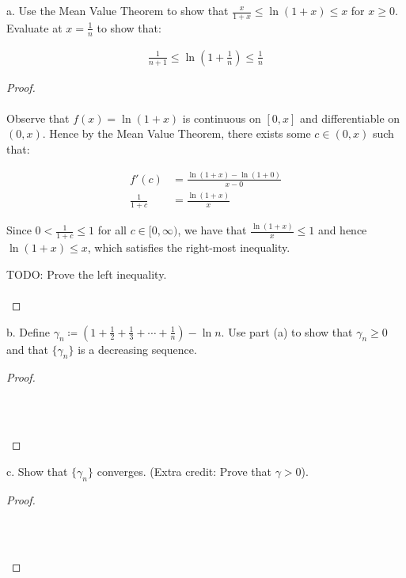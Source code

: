 a.  Use the Mean Value Theorem to show that
    $\frac{x}{1 + x} \le \ln{\left(1 + x\right)} \le x$ for $x \ge 0$. Evaluate at
    $x = \frac{1}{n}$ to show that:

    \begin{align*}
        \frac{1}{n+1} \le \ln{\left(1 + \frac{1}{n}\right)} \le \frac{1}{n}
    \end{align*}

    \begin{proof}\renewcommand{\qedsymbol}{}\ \\\\
        Observe that $f(x) = \ln{(1+x)}$ is continuous on $[0, x]$ and
        differentiable on $(0, x)$. Hence by the Mean Value Theorem, there
        exists some $c \in (0, x)$ such that:
    
        \begin{align*}
            f'(c) &= \frac{\ln(1+x) - \ln(1+0)}{x-0} \\
            \frac{1}{1+c} &= \frac{\ln(1+x)}{x}
        \end{align*}

        Since $0 < \frac{1}{1+c} \le 1$ for all $c \in [0, \infty)$, we have
        that $\frac{\ln{(1+x)}}{x} \le 1$ and hence $\ln{(1+x)} \le x$, which
        satisfies the right-most inequality.

        TODO: Prove the left inequality.
        \\\\
    \end{proof}
    \pagebreak

b.  Define $\gamma_n \coloneqq \left(1 + \frac{1}{2} + \frac{1}{3} + \cdots + \frac{1}{n} \right) - \ln{n}.$
    Use part (a) to show that $\gamma_n \ge 0$ and that $\{\gamma_n\}$ is a
    decreasing sequence.

    \begin{proof}\renewcommand{\qedsymbol}{}\ \\\\

        \begin{align*}
        \end{align*}
        \\\\
    \end{proof}
    \pagebreak

c.  Show that $\{\gamma_n\}$ converges. (Extra credit: Prove that $\gamma > 0$).

    \begin{proof}\renewcommand{\qedsymbol}{}\ \\\\

        \begin{align*}
        \end{align*}
        \\\\
    \end{proof}